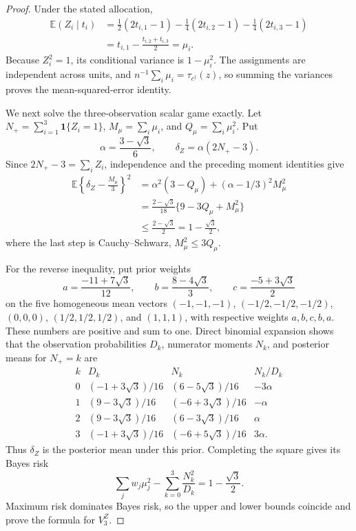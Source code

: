 \documentclass{article}
\begin{document}
\begin{proof}
Under the stated allocation,
\[
 \begin{aligned}
 \mathbb E(Z_i\mid t_i)
 &=\frac12(2t_{i,1}-1)-\frac14(2t_{i,2}-1)-\frac14(2t_{i,3}-1)\\
 &=t_{i,1}-\frac{t_{i,2}+t_{i,3}}2=\mu_i.
 \end{aligned}
\]
Because \(Z_i^2=1\), its conditional variance is \(1-\mu_i^2\).  The assignments are independent across units, and \(n^{-1}\sum_i\mu_i=\tau_{c^\dagger}(z)\), so summing the variances proves the mean-squared-error identity.

We next solve the three-observation scalar game exactly.  Let \(N_+=\sum_{i=1}^3\mathbf1\{Z_i=1\}\), \(M_\mu=\sum_i\mu_i\), and \(Q_\mu=\sum_i\mu_i^2\).  Put
\[
 \alpha=\frac{3-\sqrt3}{6},
 \qquad \delta_Z=\alpha(2N_+-3).
\]
Since \(2N_+-3=\sum_iZ_i\), independence and the preceding moment identities give
\[
 \begin{aligned}
 \mathbb E\left\{\delta_Z-\frac{M_\mu}{3}\right\}^2
 &=\alpha^2(3-Q_\mu)+(\alpha-1/3)^2M_\mu^2\\
 &=\frac{2-\sqrt3}{18}\{9-3Q_\mu+M_\mu^2\}\\
 &\leq\frac{2-\sqrt3}{2}=1-\frac{\sqrt3}{2},
 \end{aligned}
\]
where the last step is Cauchy--Schwarz, \(M_\mu^2\leq3Q_\mu\).

For the reverse inequality, put prior weights
\[
 a=\frac{-11+7\sqrt3}{12},\qquad
 b=\frac{8-4\sqrt3}{3},\qquad
 c=\frac{-5+3\sqrt3}{2}
\]
on the five homogeneous mean vectors \((-1,-1,-1)\), \((-1/2,-1/2,-1/2)\), \((0,0,0)\), \((1/2,1/2,1/2)\), and \((1,1,1)\), with respective weights \(a,b,c,b,a\).  These numbers are positive and sum to one.  Direct binomial expansion shows that the observation probabilities \(D_k\), numerator moments \(N_k\), and posterior means for \(N_+=k\) are
\[
 \begin{array}{c|c|c|c}
 k&D_k&N_k&N_k/D_k\\ \hline
 0&(-1+3\sqrt3)/16&(6-5\sqrt3)/16&-3\alpha\\
 1&(9-3\sqrt3)/16&(-6+3\sqrt3)/16&-\alpha\\
 2&(9-3\sqrt3)/16&(6-3\sqrt3)/16&\alpha\\
 3&(-1+3\sqrt3)/16&(-6+5\sqrt3)/16&3\alpha.
 \end{array}
\]
Thus \(\delta_Z\) is the posterior mean under this prior.  Completing the square gives its Bayes risk
\[
 \sum_jw_j\mu_j^2-\sum_{k=0}^3\frac{N_k^2}{D_k}
 =1-\frac{\sqrt3}{2}.
\]
Maximum risk dominates Bayes risk, so the upper and lower bounds coincide and prove the formula for \(V_3^Z\).


\end{proof}
\end{document}
